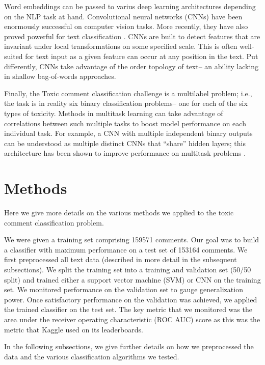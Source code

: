 \documentclass[12pt]{article}
\begin{document}
Word embeddings can be passed to varius deep learning architectures depending on the NLP task at hand. Convolutional neural networks (CNNs) have been enormously successful on computer vision tasks. More recently, they have also proved powerful for text classification \cite{collobert2008unified, collobert2011natural}. CNNs are built to detect features that are invariant under local transformations on some specified scale. This is often well-suited for text input as a given feature can occur at any position in the text. Put differently, CNNs take advantage of the order topology of text-- an ability lacking in shallow bag-of-words approaches.

Finally, the Toxic comment classification challenge is a multilabel problem; i.e., the task is in reality six binary classification problems-- one for each of the six types of toxicity. Methods in multitask learning can take advantage of correlations between such multiple tasks to boost model performance on each individual task. For example, a CNN with multiple independent binary outputs can be understood as multiple distinct CNNs that ``share'' hidden layers; this architecture has been shown to improve performance on multitask problems \cite{collobert2008unified}.


\section{Methods}

Here we give more details on the various methods we applied to the toxic comment classification problem.

We were given a training set comprising 159571 comments. Our goal was to build a classifier with maximum performance on a test set of 153164 comments. We first preprocessed all text data (described in more detail in the subsequent subsections). We split the training set into a training and validation set (50/50 split) and trained either a support vector machine (SVM) or CNN on the training set. We monitored performance on the validation set to gauge generalization power. Once satisfactory performance on the validation was achieved, we applied the trained classifier on the test set. The key metric that we monitored was the area under the receiver operating characteristic (ROC AUC) score as this was the metric that Kaggle used on its leaderboards.

In the following subsections, we give further details on how we preprocessed the data and the various classification algorithms we tested.
\end{document}
